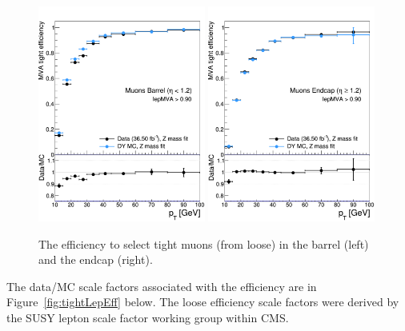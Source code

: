 \begin{figure}[hbtp]
 \begin{center}
   \includegraphics[width=0.49\textwidth]{ch4_figs/tnp_eff_mb_2lss_pt.pdf}
   \includegraphics[width=0.49\textwidth]{ch4_figs/tnp_eff_me_2lss_pt.pdf}
   \caption[Tight muon efficiencies in barrel and endcap]{The efficiency to select tight muons (from loose) in the barrel (left) and the endcap (right).}
   \label{fig:mu_eff}
   \end{center}
\end{figure}

The data/MC scale factors associated with the efficiency are in Figure~\ref{fig:tightLepEff} below. The loose efficiency scale factors were derived
by the SUSY lepton scale factor working group within CMS.

